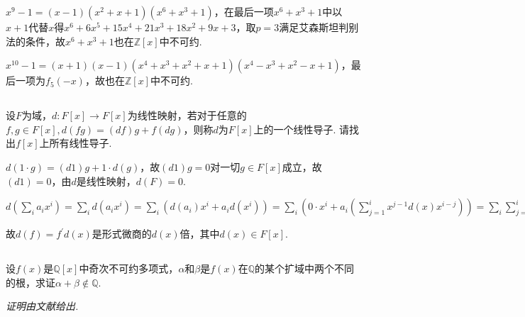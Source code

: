 $x^9-1=(x-1)(x^2+x+1)(x^6+x^3+1)$，在最后一项$x^6+x^3+1$中以$x+1$代替$x$得$x^6+6x^5+15x^4+21x^3+18x^2+9x+3$，取$p=3$满足艾森斯坦判别法的条件，故$x^6+x^3+1$也在$\mathbb{Z}[x]$中不可约.

$x^{10}-1=(x+1)(x-1)(x^4+x^3+x^2+x+1)(x^4-x^3+x^2-x+1)$，最后一项为$f_5(-x)$，故也在$\mathbb{Z}[x]$中不可约.

\subsection{}
设$F$为域，$d: F[x]\rightarrow F[x]$为线性映射，若对于任意的$f,g\in F[x], d(fg)=(df)g+f(dg)$，则称$d$为$F[x]$上的一个{\heiti 线性导子}. 请找出$f[x]$上所有线性导子.

\jie $d(1\cdot g)=(d1)g+1\cdot d(g)$，故$(d1)g=0$对一切$g\in F[x]$成立，故$(d1)=0$，由$d$是线性映射，$d(F)=0$.

$d\left(\sum_i a_ix^i\right)=\sum_i d(a_ix^i)=\sum_i (d(a_i)x^i+a_id(x^i))
=\sum_i(0\cdot x^i+a_i(\sum_{j=1}^ix^{j-1}d(x)x^{i-j}))=\sum_i\sum_{j=1}^ia_ix^{i-1}d(x)
=\sum_iia_ix^{i-1}d(x)$

故$d(f)=f^{\prime}d(x)$是形式微商的$d(x)$倍，其中$d(x)\in F[x]$.

\subsection{}
设$f(x)$是$\mathbb{Q}[x]$中奇次不可约多项式，$\alpha$和$\beta$是$f(x)$在$\mathbb{Q}$的某个扩域中两个不同的根，求证$\alpha+\beta\notin\mathbb{Q}$.

\emph{证明由文献}\cite{3126329}\emph{给出.}

